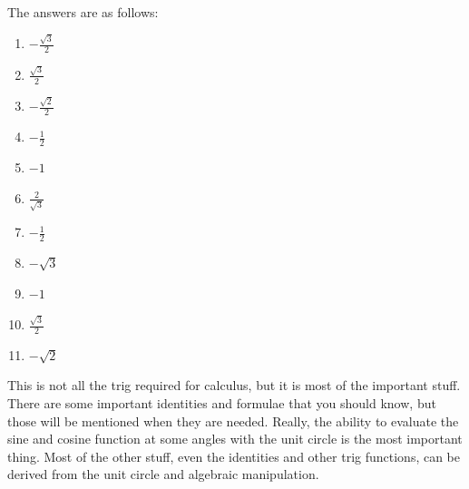 \documentclass[12pt]{article}
\begin{document}
The answers are as follows:

\begin{enumerate}
    \item $\displaystyle -\frac{\sqrt{3}}{2}$
    \item $\displaystyle \frac{\sqrt{3}}{2}$
    \item $\displaystyle -\frac{\sqrt{2}}{2}$
    \item $\displaystyle -\frac{1}{2}$
    \item $\displaystyle -1$
    \item $\displaystyle \frac{2}{\sqrt{3}}$
    \item $\displaystyle -\frac{1}{2}$
    \item $\displaystyle -\sqrt{3}$
    \item $\displaystyle -1$
    \item $\displaystyle \frac{\sqrt{3}}{2}$
    \item $\displaystyle -\sqrt{2}$
\end{enumerate}

This is not all the trig required for calculus, but it is most of the important stuff.
There are some important identities and formulae that you should know, but those will be mentioned when they are needed.
Really, the ability to evaluate the sine and cosine function at some angles with the unit circle is the most important thing.
Most of the other stuff, even the identities and other trig functions, can be derived from the unit circle and algebraic manipulation.
\end{document}
